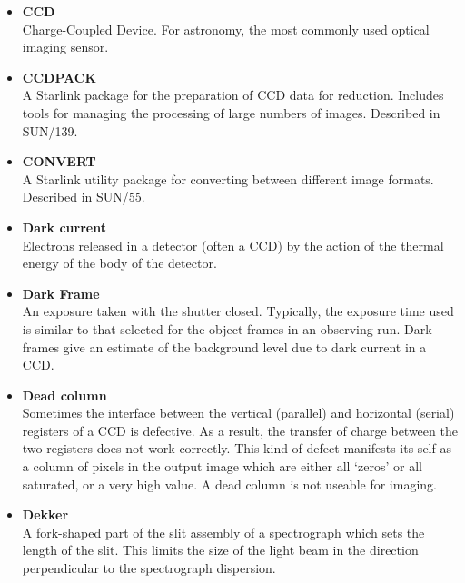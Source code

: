 \documentclass[twoside,11pt]{article}
\newcommand{\htmlref}[2]{#1}
\newcommand{\xref}[3]{#1}
\begin{document}
\begin{itemize}
\item {\bf\label{gl_ccd}CCD}\\
      Charge-Coupled Device.   For astronomy, the most commonly used
      optical imaging sensor.

\item {\bf\label{gl_ccdpack}CCDPACK}\\
      A Starlink package for the preparation of CCD data for reduction.
      Includes tools for managing the processing of large numbers of
      images.  Described in \xref{SUN/139}{sun139}{}.

\item {\bf\label{gl_convert}CONVERT}\\
      A Starlink utility package for converting between different image
      formats.  Described in \xref{SUN/55}{sun55}{}\cite{convert}.

\item {\bf\label{gl_dark_current}Dark current}\\
      Electrons released in a detector (often a CCD) by the action of
      the thermal energy of the body of the detector.

\item {\bf\label{gl_dark_frame}Dark Frame}\\
      An exposure taken with the shutter closed.  Typically, the
      exposure time used is similar to that selected for the object
      frames in an observing run.  Dark frames give an estimate of
      the background level due to \htmlref{dark current}{gl_dark_current}
      in a CCD.

\item {\bf\label{gl_dead_column}Dead column}\\
      Sometimes the interface between the vertical (parallel) and horizontal
      (serial) registers of a \htmlref{CCD}{gl_ccd} is defective.  As a
      result, the transfer of charge between the two registers does not
      work correctly.  This kind of defect manifests its self as a column
      of pixels in the output image which are either all `zeros' or all
      saturated, or a very high value.  A dead column is not useable
      for imaging.

\item {\bf\label{gl_dekker}Dekker}\\
      A fork-shaped part of the slit assembly of a spectrograph which
      sets the length of the slit.  This limits the size of the light
      beam in the direction perpendicular to the spectrograph dispersion.


\end{itemize}
\end{document}
